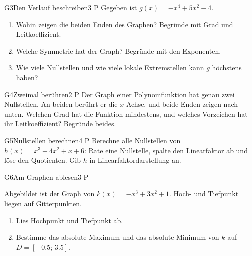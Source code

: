 \documentclass[11pt]{article}
\begin{document}
\begin{lpaufgabe}{G3}{Den Verlauf beschreiben}{3 P}
Gegeben ist $g(x) = -x^{4} + 5x^{2} - 4$.
\begin{enumerate}[label=(\alph*),leftmargin=*,itemsep=1pt]
\item Wohin zeigen die beiden Enden des Graphen? Begründe mit Grad und Leitkoeffizient.
\item Welche Symmetrie hat der Graph? Begründe mit den Exponenten.
\item Wie viele Nullstellen und wie viele lokale Extremstellen kann $g$ höchstens haben?
\end{enumerate}
\end{lpaufgabe}

\begin{lpaufgabe}{G4}{Zweimal berühren}{2 P}
Der Graph einer Polynomfunktion hat genau zwei Nullstellen. An beiden berührt er die $x$-Achse, und beide Enden zeigen nach unten.
Welchen Grad hat die Funktion mindestens, und welches Vorzeichen hat ihr Leitkoeffizient? Begründe beides.
\end{lpaufgabe}


\begin{lpaufgabe}{G5}{Nullstellen berechnen}{4 P}
Berechne alle Nullstellen von $h(x) = x^{3} - 4x^{2} + x + 6$: Rate eine Nullstelle, spalte den Linearfaktor ab und löse den Quotienten. Gib $h$ in Linearfaktordarstellung an.
\end{lpaufgabe}

\begin{lpaufgabe}{G6}{Am Graphen ablesen}{3 P}
\begin{minipage}[t]{0.52\linewidth}
Abgebildet ist der Graph von $k(x) = -x^{3} + 3x^{2} + 1$. Hoch- und Tiefpunkt liegen auf Gitterpunkten.
\begin{enumerate}[label=(\alph*),leftmargin=*,itemsep=1pt]
\item Lies Hochpunkt und Tiefpunkt ab.
\item Bestimme das absolute Maximum und das absolute Minimum von $k$ auf $D = [-0.5;\, 3.5]$.
\end{enumerate}
\end{minipage}\hfill
\begin{minipage}[t]{0.42\linewidth}\vspace{0pt}\centering
{}
\end{minipage}
\end{lpaufgabe}
\end{document}
